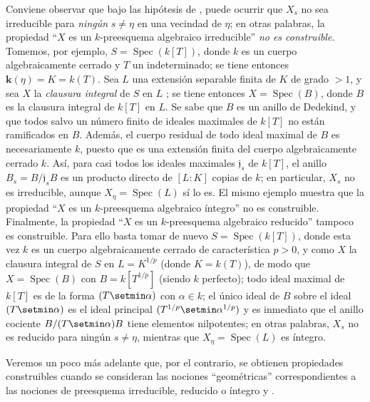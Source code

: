 \begin{remark}[9.5.7]
\label{IV.9.5.7}
Conviene observar que bajo las hipótesis de , puede ocurrir que $X_s$ no sea irreducible para \emph{ningún} $s\neq\eta$ en una vecindad de $\eta$; en otras palabras, la propiedad ``$X$ es un $k$-preesquema algebraico irreducible'' \emph{no es construible}.
Tomemos, por ejemplo, $S=\operatorname{Spec}(k[T])$, donde $k$ es un cuerpo algebraicamente cerrado y $T$ un indeterminado; se tiene entonces $\boldsymbol{k}(\eta)=K=k(T)$.
Sea $L$ una extensión separable finita de $K$ de grado $>1$, y sea $X$ la \emph{clausura integral} de $S$ en $L$ ; se tiene entonces $X=\operatorname{Spec}(B)$, donde $B$ es la clausura integral de $k[T]$ en $L$.
Se sabe que $B$ es un anillo de Dedekind, y que todos salvo un número finito de ideales maximales de $k[T]$ no están ramificados en $B$. Además, el cuerpo residual de todo ideal maximal de $B$ es necesariamente $k$, puesto que es una extensión finita del cuerpo algebraicamente cerrado $k$. Así, para casi todos los ideales maximales $\mathfrak j_s$ de $k[T]$, el anillo $B_s=B/\mathfrak j_sB$ es un producto directo de $[L:K]$ copias de $k$; en particular, $X_s$ no es irreducible, aunque $X_\eta=\operatorname{Spec}(L)$ sí lo es.
El mismo ejemplo muestra que la propiedad ``$X$ es un $k$-preesquema algebraico íntegro'' no es construible.
Finalmente, la propiedad ``$X$ es un $k$-preesquema algebraico reducido'' tampoco es construible.
Para ello basta tomar de nuevo $S=\operatorname{Spec}(k[T])$, donde esta vez $k$ es un cuerpo algebraicamente cerrado de característica $p>0$, y como $X$ la clausura integral de $S$ en $L=K^{1/p}$ (donde $K=k(T)$), de modo que $X=\operatorname{Spec}(B)$ con $B=k[T^{1/p}]$ (siendo $k$ perfecto); todo ideal maximal de $k[T]$ es de la forma $(T\setmin\alpha)$ con $\alpha\in k$; el único ideal de $B$ sobre el ideal $(T\setmin\alpha)$ es el ideal principal $(T^{1/p}\setmin\alpha^{1/p})$ y es inmediato
que el anillo cociente $B/(T\setmin\alpha)B$ tiene elementos nilpotentes; en otras palabras, $X_s$ no es reducido para ningún $s\neq\eta$, mientras que $X_\eta=\operatorname{Spec}(L)$ es íntegro.

Veremos un poco más adelante  que, por el contrario, se obtienen propiedades construibles cuando se consideran las nociones ``geométricas'' correspondientes a las nociones de preesquema irreducible, reducido o íntegro  y .
\end{remark}

